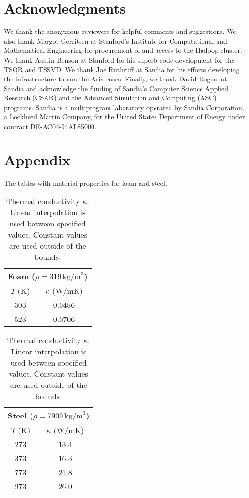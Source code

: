 \documentclass[final]{siamltex}
\begin{document}
\section{Acknowledgments}
We thank the anonymous reviewers for helpful comments and suggestions.
We also thank Margot Gerritsen at Stanford's Institute for
Computational and Mathematical Engineering for procurement of and
access to the Hadoop cluster. We thank Austin Benson at Stanford for
his superb code development for the TSQR and TSSVD. We thank Joe
Ruthruff at Sandia for his efforts developing the infrastructure to
run the Aria cases. Finally, we thank David Rogers at Sandia and
acknowledge the funding of Sandia's Computer Science Applied Research
(CSAR) and the Advanced Simulation and Computing (ASC) programs.  Sandia is a multiprogram laboratory operated by Sandia Corporation, a Lockheed Martin Company, for the United States Department of Energy under contract DE-AC04-94AL85000.

\section{Appendix}
The tables with material properties for foam and steel.

\begin{table}[H]
\centering
\begin{tabular}{c|c}
\multicolumn{2}{c}{Foam ($\rho=319\,\mathrm{kg/m}^{3}$)} \\
\hline
$T$ (K) & $\kappa$ (W/mK) \\
\hline
303 & 0.0486  \\
523 & 0.0706 \\
\end{tabular} \quad
\begin{tabular}{c|c}
\multicolumn{2}{c}{Steel ($\rho=7900\,\mathrm{kg/m}^{3}$)} \\
\hline
$T$ (K) & $\kappa$ (W/mK) \\
\hline
273 & 13.4 \\
373 & 16.3 \\
773 & 21.8 \\
973 & 26.0 \\
\end{tabular}
\caption{Thermal conductivity $\kappa$.  Linear interpolation is used
  between specified values.  Constant values are used outside of the
  bounds.}
\label{t:cond}
\end{table}
\end{document}
